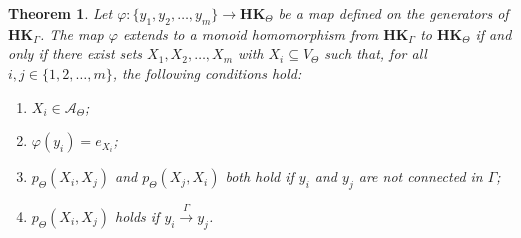 \documentclass[pdflatex,sn-mathphys-num]{sn-jnl}
\newcommand{\hk}{\mathbf{HK}_{\Theta}}
\newcommand{\hkg}{\mathbf{HK}_{\Gamma}}
\newcommand{\vp}{\varphi}
\newcommand{\tog}{\overset{\Gamma}{\to}}
\newtheorem{theorem}{Theorem}[section]
\theoremstyle{definition}
\theoremstyle{remark}
\begin{document}
\begin{theorem}\label{theorem:p-pure}
    Let $\vp : \{y_1, y_2, \dots, y_m\} \to \hk$ be a map defined on the generators of $\hkg$.
    The map $\vp$ extends to a monoid homomorphism from $\hkg$ to $\hk$ if and only if there exist sets $X_1, X_2, \dots, X_m$ with
    $X_i \subseteq V_{\Theta}$ such that, for all $i, j \in \{1, 2, \dots, m\}$, the following conditions hold:
    \begin{enumerate}[label=(\roman*), ref=\roman*]
        \item\label{p1} $X_i \in \mathcal{A}_{\Theta}$;
        \item\label{p2} $\vp(y_i) = e_{X_i}$;
        \item\label{p3} $p_{\Theta}(X_i, X_j)$ and $p_{\Theta}(X_j, X_i)$ both hold if $y_i$ and $y_j$ are not connected in $\Gamma$;
        \item\label{p4} $p_{\Theta}(X_i, X_j)$ holds if $y_i \tog y_j$.
    \end{enumerate}
\end{theorem}
\end{document}
